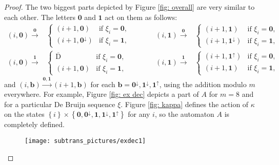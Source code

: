 \documentclass{ws-ijmpc}
\begin{document}
\begin{proof}
The two biggest parts depicted by Figure \ref{fig: overall} are very
similar to each other. The letters $\mathbf{0}$ and $\mathbf{1}$
act on them as follows:
\[
\begin{aligned}\left(i,\mathbf{0}\right)\overset{\mathbf{0}}{\longrightarrow} & \begin{cases}
\left(i+1,\mathbf{0}\right) & \mbox{if }\ensuremath{\xi_{i}=\mathbf{0}},\\
\left(i+1,\mathbf{0^{\downarrow}}\right) & \mbox{if }\ensuremath{\xi_{i}=\mathbf{1}},
\end{cases}\\
\left(i,\mathbf{0}\right)\overset{\mathbf{1}}{\longrightarrow} & \begin{cases}
\overline{\mathrm{D}} & \mbox{if }\ensuremath{\xi_{i}=\mathbf{0}},\\
\left(i+1,\mathbf{0}\right) & \mbox{if }\ensuremath{\xi_{i}=\mathbf{1}},
\end{cases}
\end{aligned}
\mbox{ }\qquad\begin{aligned}\left(i,\mathbf{1}\right)\overset{\mathbf{0}}{\longrightarrow} & \begin{cases}
\left(i+1,\mathbf{1}\right) & \mbox{if }\ensuremath{\xi_{i}=\mathbf{0}},\\
\left(i+1,\mathbf{1^{\downarrow}}\right) & \mbox{if }\ensuremath{\xi_{i}=\mathbf{1}},
\end{cases}\\
\left(i,\mathbf{1}\right)\overset{\mathbf{1}}{\longrightarrow} & \begin{cases}
\left(i+1,\mathbf{1^{\uparrow}}\right) & \mbox{if }\ensuremath{\xi_{i}=\mathbf{0}},\\
\left(i+1,\mathbf{1}\right) & \mbox{if }\ensuremath{\xi_{i}=\mathbf{1}},
\end{cases}
\end{aligned}
\]
and $\left(i,\mathbf{b}\right)\overset{\mathbf{0},\mathbf{1}}{\longrightarrow}\left(i+1,\mathbf{b}\right)$
for each $\mathbf{b}=\mathbf{0^{\downarrow}},\mathbf{1^{\downarrow}},\mathbf{1^{\uparrow}}$,
using the addition modulo $m$ everywhere. For example, Figure \ref{fig: ex dec}
depicts a part of $A$ for $m=8$ and for a particular De Bruijn sequence
$\xi$. Figure \ref{fig: kappa} defines the action of $\kappa$ on
the states $\left\{ i\right\} \times\left\{ \mathbf{0},\mathbf{0^{\downarrow}},\mathbf{1},\mathbf{1^{\downarrow}},\mathbf{1^{\uparrow}}\right\} $
for any $i$, so the automaton $A$ is completely defined.
\begin{figure}
\begin{centering}
\texttt{[image: subtrans\_pictures/exdec1]}
\par\end{centering}


\end{figure}
\end{proof}
\end{document}
